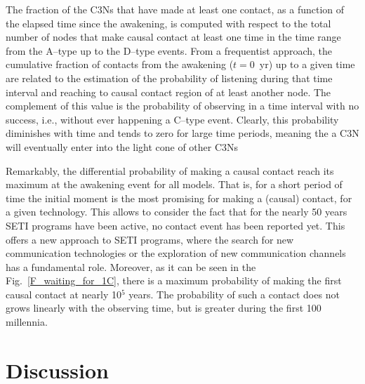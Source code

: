 \documentclass[crop]{CSLB}
\newcommand{\ceti}{C3N}
\newcommand{\cetis}{C3Ns}
\begin{document}
The fraction of the \cetis{} that have made at least one contact, as a
function of the elapsed time since the awakening, is computed with
respect to the total number of nodes that make causal contact at least
one time in the time range from the A--type up to the D--type
events.
%
From a frequentist approach, the cumulative fraction of contacts
from the awakening
($t=$0~yr) up to a given time are related to the estimation of the
probability of listening during that time interval and reaching to
causal contact region of at least another node.
%
The complement of this value is the probability of observing in a time
interval with no success, i.e., without ever happening a C--type
event.
%
Clearly, this probability diminishes with time and tends to zero for
large time periods, meaning the a \ceti{} will eventually enter into 
the light cone of other \cetis{}


Remarkably, the differential probability of making a causal contact reach its
maximum at the awakening event for all models.
%
That is, for a short period of time the initial moment is the most promising
for making a (causal) contact, for a given technology.
%
This allows to consider the fact that for the nearly 50 years SETI
programs have been active, no contact event has been reported yet.
%
This offers a new approach to SETI programs, where the
search for new communication technologies or the exploration of
new communication channels has a fundamental role.
%
Moreover, as it can be seen in the Fig.~\ref{F_waiting_for_1C}, there
is a maximum probability of making the first causal contact at nearly
10$^5$ years.
%
The probability of such a contact does not grows linearly
with the observing time, but is greater during the first 100
millennia.


\section{Discussion}\label{S_discussion}
\end{document}
